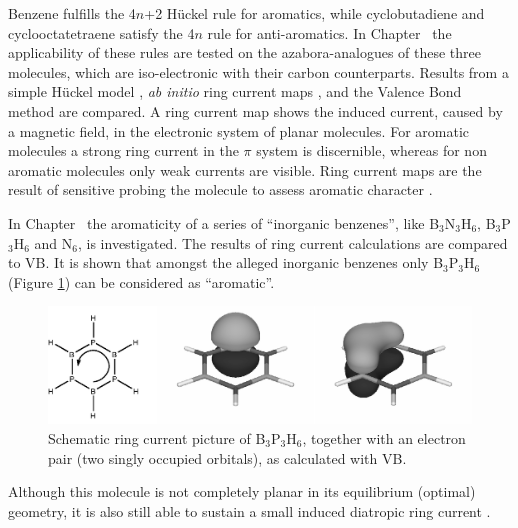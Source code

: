Benzene fulfills the 4$n$+2 H\"{u}ckel rule for aromatics, while cyclobutadiene and cyclooctatetraene satisfy the 4$n$ rule for anti-aromatics. In Chapter \chhuckel\ the applicability of these rules are tested on the azabora-analogues of these three molecules, which are iso-electronic with their carbon counterparts. Results from a simple H\"{u}ckel model \cite{huckel1,huckel2,huckel3,huckel4}, \textit{ab initio} ring current maps \cite{london,ctocd1,ctocd2,ctocd3,ctocd4}, and the Valence Bond method are compared. A ring current map shows the induced current, caused by a magnetic field, in the electronic system of planar molecules. For aromatic molecules a strong ring current in the $\pi$ system is discernible, whereas for non aromatic molecules only weak currents are visible. Ring current maps are the result of sensitive probing the molecule to assess aromatic character \cite{huckel}.

In Chapter \chinorganic\ the aromaticity of a series of ``inorganic benzenes'', like B$_3$N$_3$H$_6$, B$_3$P$_3$H$_6$ and N$_6$, is investigated. The results of ring current calculations are compared to VB. It is shown that amongst the alleged inorganic benzenes only B$_3$P$_3$H$_6$ (Figure \ref{ch1.fig.b3p3h6}) can be considered as ``aromatic''.
 \begin{figure}[ht]
\center
\includegraphics[width=5in]{introduction/figures/b3p3h6.eps}
\caption{Schematic ring current picture of B$_3$P$_3$H$_6$, together with an electron pair (two singly occupied orbitals), as calculated with VB.}
\label{ch1.fig.b3p3h6}
\end{figure}
 Although this molecule is not completely planar in its equilibrium (optimal) geometry, it is also still able to sustain a small induced diatropic ring current \cite{inorganic}.


